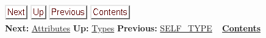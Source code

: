 \documentclass[]{article}
\begin{document}
\href{node10.html}{\includegraphics{next.png}}
\href{node7.html}{\includegraphics{up.png}}
\href{node8.html}{\includegraphics{prev.png}}
\href{node1.html}{\includegraphics{contents.png}} \\ \textbf{Next:}
\href{node10.html}{Attributes} \textbf{Up:} \href{node7.html}{Types}
\textbf{Previous:} \href{node8.html}{SELF\_TYPE} ~
\textbf{\href{node1.html}{Contents}}
\end{document}

